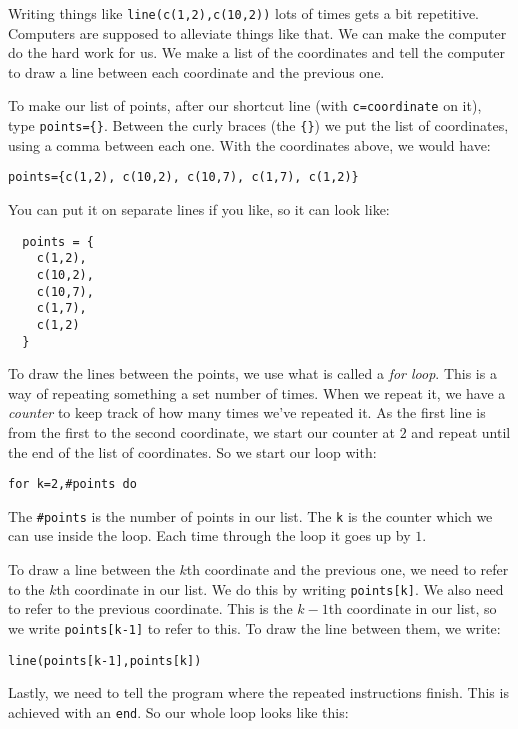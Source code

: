 \documentclass[
  xhtml,%
  use filename%
]{internet}
\begin{document}
Writing things like \verb+line(c(1,2),c(10,2))+ lots of times gets a bit repetitive.
Computers are supposed to alleviate things like that.
We can make the computer do the hard work for us.
We make a list of the coordinates and tell the computer to draw a line between each coordinate and the previous one.

To make our list of points, after our shortcut line (with \verb+c=coordinate+ on it), type \verb+points={}+.
Between the curly braces (the \verb+{}+) we put the list of coordinates, using a comma between each one.
With the coordinates above, we would have:

\begin{verbatim}
points={c(1,2), c(10,2), c(10,7), c(1,7), c(1,2)}
\end{verbatim}

You can put it on separate lines if you like, so it can look like:

\begin{verbatim}
  points = {
    c(1,2),
    c(10,2),
    c(10,7),
    c(1,7),
    c(1,2)
  }
\end{verbatim}

To draw the lines between the points, we use what is called a \emph{for loop}.
This is a way of repeating something a set number of times.
When we repeat it, we have a \emph{counter} to keep track of how many times we've repeated it.
As the first line is from the first to the second coordinate, we start our counter at \(2\) and repeat until the end of the list of coordinates.
So we start our loop with:

\begin{verbatim}
for k=2,#points do
\end{verbatim}

The \verb+#points+ is the number of points in our list.
The \verb+k+ is the counter which we can use inside the loop.
Each time through the loop it goes up by \(1\).

To draw a line between the \(k\)th coordinate and the previous one, we need to refer to the \(k\)th coordinate in our list.
We do this by writing \verb+points[k]+.
We also need to refer to the previous coordinate.
This is the \(k-1\)th coordinate in our list, so we write \verb+points[k-1]+ to refer to this.
To draw the line between them, we write:

\begin{verbatim}
line(points[k-1],points[k])
\end{verbatim}

Lastly, we need to tell the program where the repeated instructions finish.
This is achieved with an \verb+end+.
So our whole loop looks like this:
\end{document}
